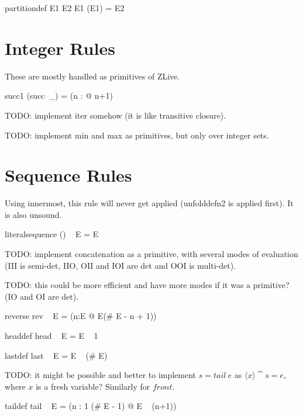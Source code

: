 \documentclass{article}
\begin{document}
\begin{zedrule}{partitiondef}
   E1 \partition E2 \iff \disjoint E1 \land \bigcup(\ran E1) = E2
\end{zedrule}


\section{Integer Rules}

These are mostly handled as primitives of ZLive.


\begin{zedrule}{succ1}
  (succ~\_) = (\lambda n : \nat @ n+1)
\end{zedrule}

TODO: implement iter somehow (it is like transitive closure).

TODO: implement min and max as primitives, but only over integer sets.


\section{Sequence Rules}

Using innermost, this rule will never get applied (unfolddefn2 is
applied first).  It is also unsound.
\begin{zedrule}{literalsequence}
   (\langle \listarg \rangle) ~ E = E
\end{zedrule}

TODO: implement concatenation as a primitive, with several
modes of evaluation (III is semi-det, IIO, OII and IOI are det
and OOI is multi-det).

TODO: this could be more efficient and have more modes if it
was a primitive? (IO and OI are det).
\begin{zedrule}{reverse}
   rev ~ E = (\lambda n:\dom E @ E(\# E - n + 1))
\end{zedrule}

\begin{zedrule}{headdef}
   head ~ E = E ~ 1
\end{zedrule}

\begin{zedrule}{lastdef}
   last ~ E = E ~ (\# E)
\end{zedrule}

TODO: it might be possible and better to implement $s=tail~e$
as $\langle x \rangle \cat s = e$, where $x$ is a fresh variable?
Similarly for $front$.
\begin{zedrule}{taildef}
   tail ~ E = (\lambda n : 1 \upto (\# E - 1) @ E ~ (n+1))
\end{zedrule}
\end{document}

